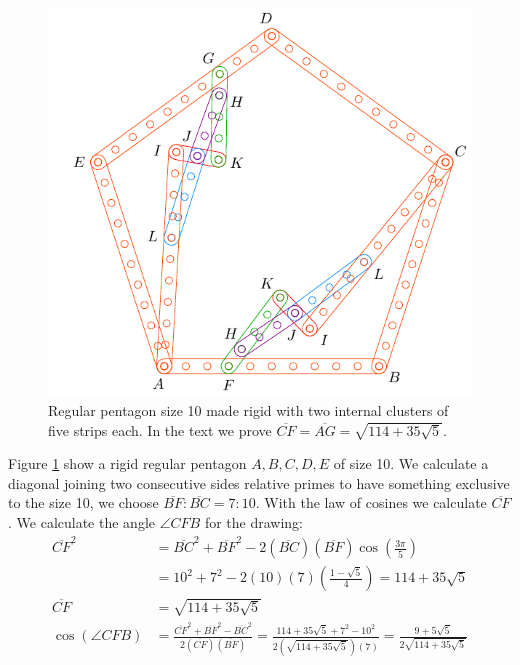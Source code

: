 \documentclass[11pt]{article}
\begin{document}
\begin{figure}[h]
 \centering
 \includegraphics[scale=0.9]{10/penta10a}
 \caption{Regular pentagon size 10 made rigid with two internal clusters of five strips each. In the text we prove $\overline{CF} = \overline{AG} = \sqrt{114 + 35\sqrt5}$.}
 \label{fig:penta10a}
\end{figure}

Figure \ref{fig:penta10a} show a rigid regular pentagon $A,B,C,D,E$ of size 10. We calculate a diagonal joining two consecutive sides relative primes to have something exclusive to the size 10, we choose $\overline{BF}:\overline{BC} = 7:10$. With the law of cosines we calculate $\overline{CF}$.
We calculate the angle $\angle{CFB}$ for the drawing:
\begin{align}
\overline{CF}^2 &= \overline{BC}^2 + \overline{BF}^2
 - 2(\overline{BC})(\overline{BF})\cos\left(\frac{3\pi}5\right) \nonumber\\
 &= 10^2 + 7^2 - 2(10)(7)\left(\frac{1-\sqrt5}4\right) = 114 + 35\sqrt5 \nonumber\\
\overline{CF} &= \sqrt{114 + 35\sqrt5} \\
\cos(\angle{CFB}) &= \frac{\overline{CF}^2 + \overline{BF}^2 - \overline{BC}^2}
 {2(\overline{CF})(\overline{BF})}%
 = \frac{114+35\sqrt5 + 7^2 - 10^2}{2(\sqrt{114 + 35\sqrt5})(7)}
  = \frac{9+5\sqrt5}{2\sqrt{114+35\sqrt5}}
\end{align}
\end{document}

